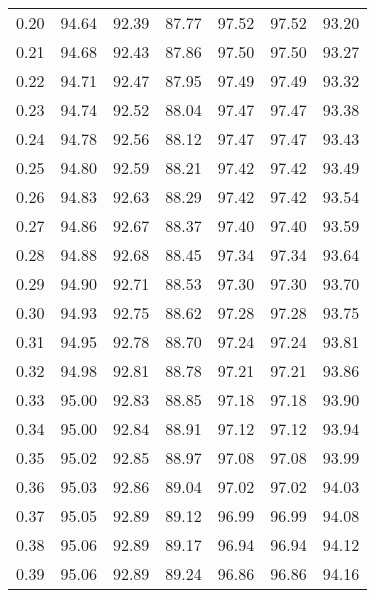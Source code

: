 \begin{tabular}{|c|c|c|c|c|c|c|}
      0.20 &     94.64 &     92.39 &      87.77 &   97.52 &      97.52 &         93.20 \\
      0.21 &     94.68 &     92.43 &      87.86 &   97.50 &      97.50 &         93.27 \\
      0.22 &     94.71 &     92.47 &      87.95 &   97.49 &      97.49 &         93.32 \\
      0.23 &     94.74 &     92.52 &      88.04 &   97.47 &      97.47 &         93.38 \\
      0.24 &     94.78 &     92.56 &      88.12 &   97.47 &      97.47 &         93.43 \\
      0.25 &     94.80 &     92.59 &      88.21 &   97.42 &      97.42 &         93.49 \\
      0.26 &     94.83 &     92.63 &      88.29 &   97.42 &      97.42 &         93.54 \\
      0.27 &     94.86 &     92.67 &      88.37 &   97.40 &      97.40 &         93.59 \\
      0.28 &     94.88 &     92.68 &      88.45 &   97.34 &      97.34 &         93.64 \\
      0.29 &     94.90 &     92.71 &      88.53 &   97.30 &      97.30 &         93.70 \\
      0.30 &     94.93 &     92.75 &      88.62 &   97.28 &      97.28 &         93.75 \\
      0.31 &     94.95 &     92.78 &      88.70 &   97.24 &      97.24 &         93.81 \\
      0.32 &     94.98 &     92.81 &      88.78 &   97.21 &      97.21 &         93.86 \\
      0.33 &     95.00 &     92.83 &      88.85 &   97.18 &      97.18 &         93.90 \\
      0.34 &     95.00 &     92.84 &      88.91 &   97.12 &      97.12 &         93.94 \\
      0.35 &     95.02 &     92.85 &      88.97 &   97.08 &      97.08 &         93.99 \\
      0.36 &     95.03 &     92.86 &      89.04 &   97.02 &      97.02 &         94.03 \\
      0.37 &     95.05 &     92.89 &      89.12 &   96.99 &      96.99 &         94.08 \\
      0.38 &     95.06 &     92.89 &      89.17 &   96.94 &      96.94 &         94.12 \\
      0.39 &     95.06 &     92.89 &      89.24 &   96.86 &      96.86 &         94.16 \\

\end{tabular}
